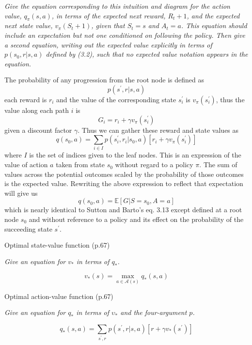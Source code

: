 \documentclass[12pt,letterpaper]{exam}
\begin{document}
\begin{questions}
	\emph{Give the equation corresponding to this intuition and diagram for the action value, \(q_\pi(s, a)\), 
	in terms of the expected next reward, \(R_t+1\), and the expected next state value, \(v_\pi(S_t+1)\), 
	given that \(S_t = s\) and \(A_t = a\). This equation should include an expectation but not one conditioned on following the policy. 
	Then give a second equation, writing out the expected value explicitly in terms of \(p(s_0,r|s, a)\) defined by (3.2), 
	such that no expected value notation appears in the equation.}
	\begin{solution}
		The probability of any progression from the root node is defined as
		\[ 
			p(s^\prime, r|s,a)
		\]
		each reward is \(r_i\) and the value of the corresponding state \(s_i^\prime\)
		is \(v_\pi(s_i^\prime)\), thus the value along each path \(i\) is
		\[ 
			G_i = r_i+\gamma v_\pi(s_i^\prime)
		\]
		given a discount factor \(\gamma\). Thus we can gather these reward and state values as
		\[ 
			q(s_0,a) =
			\sum_{i\in I} p(s_i^\prime, r_i|s_0,a) \left[r_i+\gamma v_\pi(s_i^\prime)\right] 
		\]
		where \(I\) is the set of indices given to the leaf nodes. 
		This is an expression of the value of action \(a\) taken from state \(s_0\)
		without regard to a policy \(\pi\).
		The sum of values across the potential outcomes scaled by the probability of those outcomes 
		is the expected value. 
		Rewriting the above expression to reflect that expectation will give us
		\[
			q(s_0,a) = \mathbb{E}\left[G|S=s_0,A=a\right]
		\]
		which is nearly identical to Sutton and Barto's eq. 3.13 except defined at a root node
		\(s_0\) and without reference to a policy and its effect on the probability of the succeeding
		state \(s^\prime\).

	\end{solution}

	\setcounter{question}{25-1}%
	\question%
	Optimal state-value function (p.67)

	\emph{Give an equation for \(v_*\) in terms of \(q_*\).}
	\begin{solution}
		\[ v_*(s) = \max_{a\in\mathcal{A}(s)} q_*(s,a) \]
	\end{solution}

	\question%
	Optimal action-value function (p.67)

	\emph{Give an equation for \(q_*\) in terms of \(\upsilon_*\) and the four-argument \(p\).}
	\begin{solution}
		\[ q_*(s,a) = \sum_{s^\prime,r} p(s^\prime,r|s, a)\left[ r + \gamma v_*(s^\prime) \right] \]
	\end{solution}


\end{questions}
\end{document}
